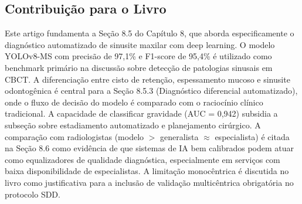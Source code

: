 \subsection{Contribuição para o Livro}
Este artigo fundamenta a Seção 8.5 do Capítulo 8, que aborda
especificamente o diagnóstico automatizado de sinusite maxilar com
deep learning. O modelo YOLOv8-MS com precisão de 97,1\% e F1-score
de 95,4\% é utilizado como benchmark primário na discussão sobre
detecção de patologias sinusais em CBCT. A diferenciação entre cisto
de retenção, espessamento mucoso e sinusite odontogênica é central
para a Seção 8.5.3 (Diagnóstico diferencial automatizado), onde o
fluxo de decisão do modelo é comparado com o raciocínio clínico
tradicional. A capacidade de classificar gravidade (AUC = 0,942)
subsidia a subseção sobre estadiamento automatizado e planejamento
cirúrgico. A comparação com radiologistas (modelo $>$ generalista
$\approx$ especialista) é citada na Seção 8.6 como evidência de que
sistemas de IA bem calibrados podem atuar como equalizadores de
qualidade diagnóstica, especialmente em serviços com baixa
disponibilidade de especialistas. A limitação monocêntrica é
discutida no livro como justificativa para a inclusão de validação
multicêntrica obrigatória no protocolo SDD.

